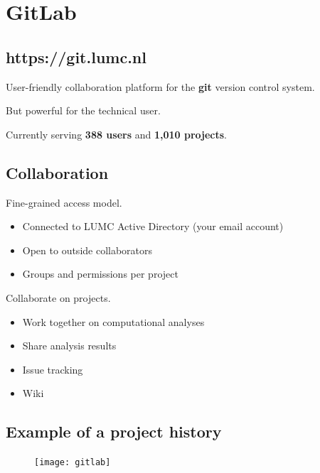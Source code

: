 \documentclass[slidestop]{beamer}
\begin{document}
\section{GitLab}

\subsection{https://git.lumc.nl}
\begin{pframe}
  User-friendly collaboration platform for the {\bf git} version control
  system.

  \bigskip
  But powerful for the technical user.

  \bigskip
  Currently serving {\bf 388 users} and {\bf 1,010 projects}.
\end{pframe}

\subsection{Collaboration}
\begin{pframe}
  \bigskip
  Fine-grained access model.
  \begin{itemize}
    \item Connected to LUMC Active Directory (your email account)
    \item Open to outside collaborators
    \item Groups and permissions per project
  \end{itemize}

  \bigskip
  \pause
  Collaborate on projects.
  \begin{itemize}
    \item Work together on computational analyses
    \item Share analysis results
    \item Issue tracking
    \item Wiki
  \end{itemize}
\end{pframe}

\subsection{Example of a project history}
\begin{pframe}
  \begin{figure}[ht!]
    \centering
    \texttt{[image: gitlab]}
  \end{figure}
\end{pframe}
\end{document}
